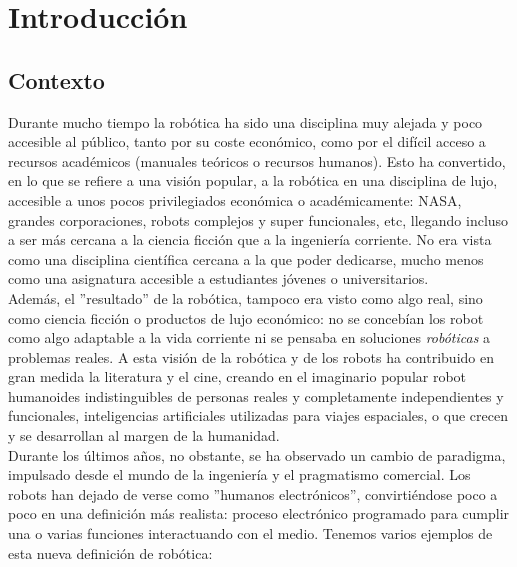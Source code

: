 \chapter{Introducción}\label{cap:introduccion}

\section{Contexto}\label{sec:contextoIntroduccion}
Durante mucho tiempo la robótica ha sido una disciplina muy alejada y poco accesible al público, tanto por su coste económico, como por el difícil acceso a recursos académicos (manuales teóricos o recursos humanos). Esto ha convertido, en lo que se refiere a una visión popular, a la robótica en una disciplina de lujo, accesible a unos pocos privilegiados económica o académicamente: NASA, grandes corporaciones, robots complejos y super funcionales, etc, llegando incluso a ser más cercana a la ciencia ficción que a la ingeniería corriente. No era vista como una disciplina científica cercana a la que poder dedicarse, mucho menos como una asignatura accesible a estudiantes jóvenes o universitarios. \\
Además, el ''resultado'' de la robótica, tampoco era visto como algo real, sino como ciencia ficción o productos de lujo económico: no se concebían los robot como algo adaptable a la vida corriente ni se pensaba en soluciones \textit{robóticas} a problemas reales. A esta visión de la robótica y de los robots ha contribuido en gran medida la literatura y el cine, creando en el imaginario popular robot humanoides indistinguibles de personas reales y completamente independientes y funcionales, inteligencias artificiales utilizadas para viajes espaciales, o que crecen y se desarrollan al margen de la humanidad.\\

Durante los últimos años, no obstante, se ha observado un cambio de paradigma, impulsado desde el mundo de la ingeniería y el pragmatismo comercial. Los robots han dejado de verse como ''humanos electrónicos'', convirtiéndose poco a poco en una definición más realista: proceso electrónico programado para cumplir una o varias funciones interactuando con el medio. Tenemos varios ejemplos de esta nueva definición de robótica:

